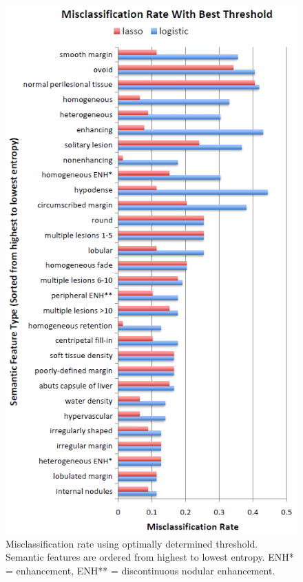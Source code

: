\begin{figure}
	\centering
	\includegraphics[width=\textwidth,height=\textheight,keepaspectratio]{figures/liver_mcr}
	\caption{Misclassification rate using optimally determined threshold. Semantic features are ordered from highest to lowest entropy. ENH* = enhancement, ENH** = discontinuous nodular enhancement.}
	\label{fig:liver_mcr}
\end{figure}


